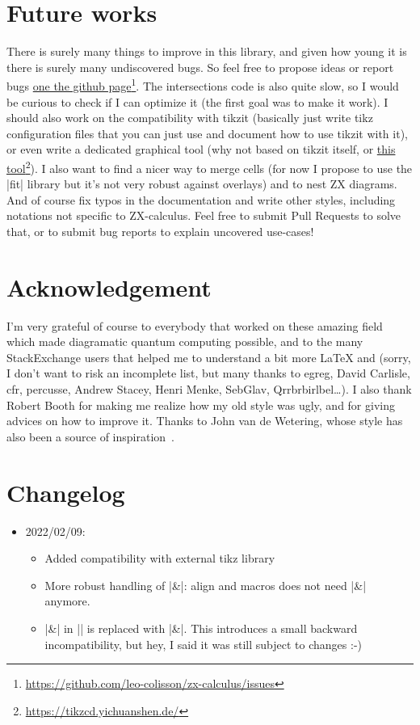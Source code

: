 \documentclass[a4paper,doc2]{ltxdoc} %
\newcommand{\mylink}[2]{\href{#1}{#2}\footnote{\url{#1}}}
\begin{document}
\section{Future works}

There is surely many things to improve in this library, and given how young it is there is surely many undiscovered bugs. So feel free to propose ideas or report bugs \mylink{https://github.com/leo-colisson/zx-calculus/issues}{one the github page}. The intersections code is also quite slow, so I would be curious to check if I can optimize it (the first goal was to make it work). I should also work on the compatibility with tikzit (basically just write tikz configuration files that you can just use and document how to use tikzit with it), or even write a dedicated graphical tool (why not based on tikzit itself, or \mylink{https://tikzcd.yichuanshen.de/}{this tool}). I also want to find a nicer way to merge cells (for now I propose to use the |fit| library but it's not very robust against overlays) and to nest ZX diagrams. And of course fix typos in the documentation and write other styles, including notations not specific to ZX-calculus. Feel free to submit Pull Requests to solve that, or to submit bug reports to explain uncovered use-cases!

\section{Acknowledgement}

I'm very grateful of course to everybody that worked on these amazing field which made diagramatic quantum computing possible, and to the many StackExchange users that helped me to understand a bit more \LaTeX{} and \tikzname{} (sorry, I don't want to risk an incomplete list, but many thanks to egreg, David Carlisle, cfr, percusse, Andrew Stacey, Henri Menke, SebGlav, Qrrbrbirlbel\dots{}). I also thank Robert Booth for making me realize how my old style was ugly, and for giving advices on how to improve it. Thanks to John van de Wetering, whose style has also been a source of inspiration~\cite{van20_ZXcalculusWorkingQuantum}.

\section{Changelog}

\begin{itemize}
\item 2022/02/09:
  \begin{itemize}
  \item Added compatibility with external tikz library
  \item More robust handling of |&|: align and macros does not need |\&| anymore.
  \item |\&| in |\zxSaveDiagram| is replaced with |&|. This introduces a small backward incompatibility, but hey, I said it was still subject to changes :-)
  \end{itemize}
\end{itemize}

\printindex

\printbibliography[heading=bibintoc]
\end{document}
